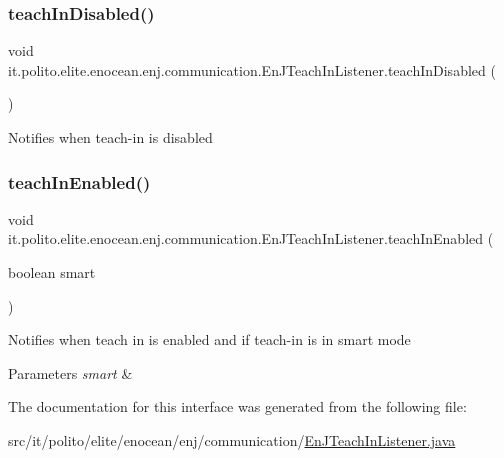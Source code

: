 \subsubsection{\texorpdfstring{teach\+In\+Disabled()}{teachInDisabled()}}
{\footnotesize\ttfamily void it.\+polito.\+elite.\+enocean.\+enj.\+communication.\+En\+J\+Teach\+In\+Listener.\+teach\+In\+Disabled (\begin{DoxyParamCaption}{ }\end{DoxyParamCaption})}

Notifies when teach-\/in is disabled \hypertarget{interfaceit_1_1polito_1_1elite_1_1enocean_1_1enj_1_1communication_1_1_en_j_teach_in_listener_ab0ddfc514ad2982f93b22f70f8b01ca6}{}\label{interfaceit_1_1polito_1_1elite_1_1enocean_1_1enj_1_1communication_1_1_en_j_teach_in_listener_ab0ddfc514ad2982f93b22f70f8b01ca6} 
\subsubsection{\texorpdfstring{teach\+In\+Enabled()}{teachInEnabled()}}
{\footnotesize\ttfamily void it.\+polito.\+elite.\+enocean.\+enj.\+communication.\+En\+J\+Teach\+In\+Listener.\+teach\+In\+Enabled (\begin{DoxyParamCaption}\item[{boolean}]{smart }\end{DoxyParamCaption})}

Notifies when teach in is enabled and if teach-\/in is in smart mode 
\begin{DoxyParams}{Parameters}
{\em smart} & \\
\hline
\end{DoxyParams}


The documentation for this interface was generated from the following file\+:\begin{DoxyCompactItemize}
\item 
src/it/polito/elite/enocean/enj/communication/\hyperlink{_en_j_teach_in_listener_8java}{En\+J\+Teach\+In\+Listener.\+java}\end{DoxyCompactItemize}
